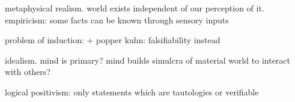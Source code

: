 metaphysical realism. world exists independent of our perception of it. empiricism: some facts can be known through sensory inputs

problem of induction:
+ popper kuhn: falsifiability instead

idealism. mind is primary? mind builds simulcra of material world to interact with others?

logical positivism: only statements which are tautologies or verifiable

